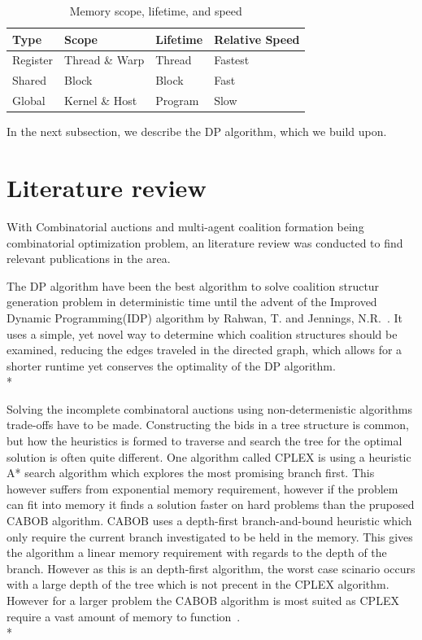 \documentclass[a4paper, 12pt]{report}
\begin{document}
\begin{table}
\centering
\caption{Memory scope, lifetime, and speed \label{mem}}
\begin{tabular}{|l|l|l|l|} \hline
Type&Scope&Lifetime&Relative Speed \\ \hline
Register&Thread \& Warp&Thread&Fastest\\
Shared&Block&Block&Fast\\
Global&Kernel \& Host&Program&Slow\\
\hline\end{tabular}
\end{table}
In the next subsection, we describe the DP algorithm, which we build upon.


\section{Literature review}
With Combinatorial auctions and multi-agent coalition formation being combinatorial optimization problem, 
an literature review was conducted to find relevant publications in the area.

The DP algorithm have been the best algorithm to solve coalition structur generation problem in deterministic 
time until the advent of the Improved Dynamic Programming(IDP) algorithm by Rahwan, T. and Jennings, N.R.~\cite{rahwan2008improved}.
It uses a simple, yet novel way to determine which coalition structures should be examined, reducing the 
edges traveled in the directed graph, which allows for a shorter runtime yet conserves the optimality of the DP algorithm.  \\*

Solving the incomplete combinatoral auctions using non-determenistic algorithms trade-offs have to be made.
Constructing the bids in a tree structure is common, but how the heuristics is formed to traverse and search the tree for the optimal solution is often quite different.
One algorithm called CPLEX is using a heuristic A* search algorithm which explores the most promising branch first. 
This however suffers from exponential memory requirement, however if the problem can fit into memory it finds a solution faster on hard problems than the pruposed CABOB algorithm.
CABOB uses a depth-first branch-and-bound heuristic which only require the current branch investigated to be held in the memory.
This gives the algorithm a linear memory requirement with regards to the depth of the branch.
However as this is an depth-first algorithm, the worst case scinario occurs with a large depth of the tree which is not precent in the CPLEX algorithm.
However for a larger problem the CABOB algorithm is most suited as CPLEX require a vast amount of memory to function~\cite{sandholm2002algorithm}.\\*
\end{document}
